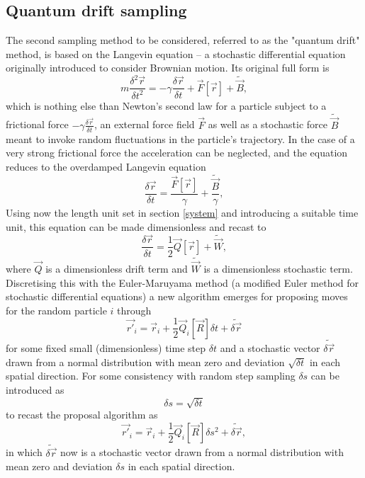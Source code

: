 \documentclass[a4paper,8pt]{article}
\begin{document}
\begin{multicols}{2}
\subsection{Quantum drift sampling} \label{QDsampling}

The second sampling method to be considered, referred to as the "quantum drift" method, is based on the Langevin equation – a stochastic differential equation originally introduced to consider Brownian motion. Its original full form is
\begin{equation}
m\frac{\delta^2\vec{r}}{\delta t^2} = -\gamma\frac{\delta\vec{r}}{\delta t}+\vec{F}[\vec{r}]+\widetilde{\vec{B}}, \label{originalLangevin}
\end{equation}
which is nothing else than Newton's second law for a particle subject to a frictional force $-\gamma\frac{\delta\vec{r}}{\delta t}$, an external force field $\vec{F}$ as well as a stochastic force $\widetilde{\vec{B}}$ meant to invoke random fluctuations in the particle's trajectory. In the case of a very strong frictional force the acceleration can be neglected, and the equation reduces to the overdamped Langevin equation
\begin{equation}
\frac{\delta\vec{r}}{\delta t} = \frac{\vec{F}[\vec{r}]}{\gamma}+\frac{\widetilde{\vec{B}}}{\gamma}, \label{overdampedLangevin}
\end{equation}
Using now the length unit set in section \ref{system} and introducing a suitable time unit, this equation can be made dimensionless and recast to
\begin{equation}
\frac{\delta\vec{r}}{\delta t} = \frac{1}{2}\vec{Q}[\vec{r}]+\widetilde{\vec{W}}, \label{Langevin}
\end{equation}
where $\vec{Q}$ is a dimensionless drift term and $\widetilde{\vec{W}}$ is a dimensionless stochastic term. Discretising this with the Euler-Maruyama method (a modified Euler method for stochastic differential equations) a new algorithm emerges for proposing moves for the random particle $i$ through
\begin{equation}
\vec{r'}_i = \vec{r}_i+\frac{1}{2}\vec{Q}_i[\vec{R}]\delta t + \widetilde{\delta\vec{r}}
\end{equation}
for some fixed small (dimensionless) time step $\delta t$ and a stochastic vector $\widetilde{\delta\vec{r}}$ drawn from a normal distribution with mean zero and deviation $\sqrt{\delta t}$ in each spatial direction. For some consistency with random step sampling $\delta s$ can be introduced as
\begin{equation}
\delta s = \sqrt{\delta t}
\end{equation}
to recast the proposal algorithm as
\begin{equation}
\vec{r'}_i = \vec{r}_i+\frac{1}{2}\vec{Q}_i[\vec{R}]\delta s^2 + \widetilde{\delta\vec{r}}, \label{propLD}
\end{equation}
in which $\widetilde{\delta\vec{r}}$ now is a stochastic vector drawn from a normal distribution with mean zero and deviation $\delta s$ in each spatial direction.


\end{multicols}
\end{document}
